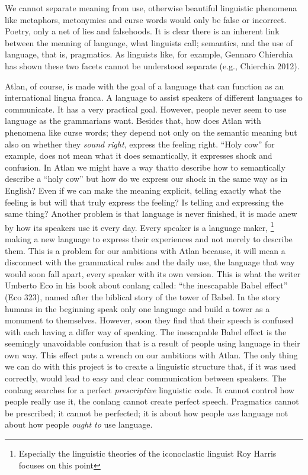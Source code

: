 We cannot separate meaning from use, otherwise beautiful linguistic phenomena like metaphors, metonymies and curse words would only be false or incorrect. Poetry, only a net of lies and falsehoods. It is clear there is an inherent link between the meaning of language, what linguists call; semantics, and the use of language, that is, pragmatics. As linguists like, for example, Gennaro Chierchia has shown these two facets cannot be understood separate (e.g., Chierchia 2012).  

Atlan, of course, is made with the goal of a language that can function as an international lingua franca. A language to assist speakers of different languages to communicate. It has a very practical goal. However, people never seem to use language as the grammarians want. Besides that, how does Atlan with phenomena like curse words; they depend not only on the semantic meaning but also on whether they {\it sound right}, express the feeling right. “Holy cow” for example, does not mean what it does semantically, it expresses shock and confusion. In Atlan we might have a way thatto describe how to semantically describe a “holy cow” but how do we express our shock in the same way as in English? Even if we can make the meaning explicit, telling exactly what the feeling is but will that truly express the feeling? Is telling and expressing the same thing? Another problem is that language is never finished, it is made anew by how its speakers use it every day. Every speaker is a language maker, \footnote{Especially the linguistic theories of the iconoclastic linguist Roy Harris focuses on this point} making a new language to express their experiences and not merely to describe them. This is a problem for our ambitions with Atlan because, it will mean a disconnect with the grammatical rules and the daily use, the language that way would soon fall apart, every speaker with its own version. This is what the writer Umberto Eco in his book about conlang called: “the inescapable Babel effect” (Eco 323), named after the biblical story of the tower of Babel. In the story humans in the beginning speak only one language and build a tower as a monument to themselves. However, soon they find that their speech is confused with each having a differ way of speaking. The inescapable Babel effect is the seemingly unavoidable confusion that is a result of people using language in their own way. This effect puts a wrench on our ambitions with Atlan. The only thing we can do with this project is to create a linguistic structure that, if it was used correctly, would lead to easy and clear communication between speakers. The conlang searches for a perfect \textit{prescriptive} linguistic code. It cannot control how people really use it, the conlang cannot create perfect speech. Pragmatics cannot be prescribed; it cannot be perfected; it is about how people \textit{use} language not about how people \textit{ought to} use language.  

